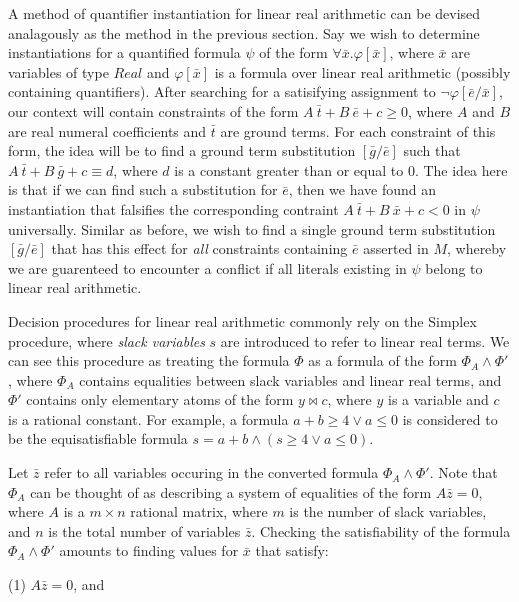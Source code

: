 \documentclass{llncs}
\begin{document}
A method of quantifier instantiation for linear real arithmetic can be devised analagously as the method in the previous section.
Say we wish to determine instantiations for a quantified formula $\psi$ of the form $\forall \bar{x}. \varphi[\bar{x}]$, where $\bar{x}$ are variables of type $Real$ and $\varphi[\bar{x}]$ is a formula over linear real arithmetic (possibly containing quantifiers).
After searching for a satisifying assignment to $\neg \varphi[\bar{e}/\bar{x}]$, our context will contain constraints of the form $A\ \bar{t} + B\ \bar{e} + c \geq 0$, where $A$ and $B$ are real numeral coefficients and $\bar{t}$ are ground terms.
For each constraint of this form, the idea will be to find a ground term substitution $[\bar{g}/\bar{e}]$ such that $A\ \bar{t} + B\ \bar{g} + c \equiv d$, where $d$ is a constant greater than or equal to $0$.
The idea here is that if we can find such a substitution for $\bar{e}$, then we have found an instantiation that falsifies the corresponding contraint $A\ \bar{t} + B\ \bar{x} + c < 0$ in $\psi$ universally.
Similar as before, we wish to find a single ground term substitution $[\bar{g}/\bar{e}]$ that has this effect for \emph{all} constraints containing $\bar{e}$ asserted in $M$, whereby we are guarenteed to encounter a conflict if all literals existing in $\psi$ belong to linear real arithmetic.

Decision procedures for linear real arithmetic commonly rely on the Simplex procedure, where \emph{slack variables} $s$ are introduced to refer to linear real terms.
We can see this procedure as treating the formula $\Phi$ as a formula of the form $\Phi_A \wedge \Phi'$, where $\Phi_A$ contains equalities between slack variables and linear real terms, and $\Phi'$ contains only elementary atoms of the form $y \bowtie c$, where $y$ is a variable and $c$ is a rational constant.
For example, a formula $a + b \geq 4 \vee a \leq 0$ is considered to be the equisatisfiable formula $s = a + b \wedge ( s \geq 4 \vee a \leq 0 )$.

Let $\bar{z}$ refer to all variables occuring in the converted formula $\Phi_A \wedge \Phi'$.
Note that $\Phi_A$ can be thought of as describing a system of equalities of the form $A \bar{z} = 0$, where $A$ is a $m \times n$ rational matrix, where $m$ is the number of slack variables, and $n$ is the total number of variables $\bar{z}$.
Checking the satisfiability of the formula $\Phi_A \wedge \Phi'$ amounts to finding values for $\bar{x}$ that satisfy:

(1) $A \bar{z} = 0$, and
\end{document}
